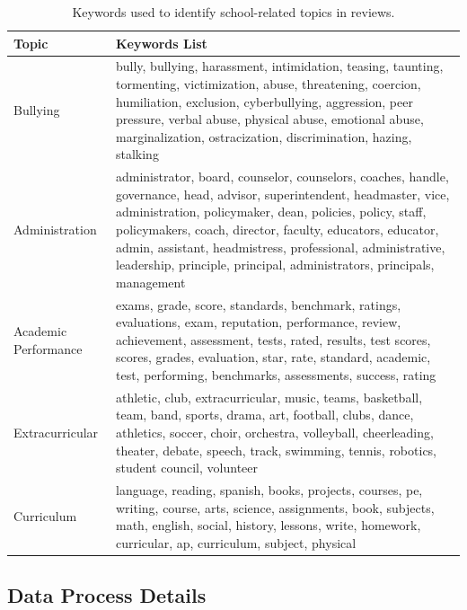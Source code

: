 \documentclass[11pt]{article}
\begin{document}
\begin{table}[!ht]
\centering
\caption{Keywords used to identify school-related topics in reviews.}
\label{tab:keywords}
\begin{tabularx}{\textwidth}{|p{2.1cm}|X|}
\hline
\textbf{Topic} & \textbf{Keywords List} \\
\hline
Bullying & bully, bullying, harassment, intimidation, teasing, taunting, tormenting, victimization, abuse, threatening, coercion, humiliation, exclusion, cyberbullying, aggression, peer pressure, verbal abuse, physical abuse, emotional abuse, marginalization, ostracization, discrimination, hazing, stalking \\
\hline
Administration & administrator, board, counselor, counselors, coaches, handle, governance, head, advisor, superintendent, headmaster, vice, administration, policymaker, dean, policies, policy, staff, policymakers, coach, director, faculty, educators, educator, admin, assistant, headmistress, professional, administrative, leadership, principle, principal, administrators, principals, management \\
\hline
Academic Performance & exams, grade, score, standards, benchmark, ratings, evaluations, exam, reputation, performance, review, achievement, assessment, tests, rated, results, test scores, scores, grades, evaluation, star, rate, standard, academic, test, performing, benchmarks, assessments, success, rating \\
\hline
Extracurricular & athletic, club, extracurricular, music, teams, basketball, team, band, sports, drama, art, football, clubs, dance, athletics, soccer, choir, orchestra, volleyball, cheerleading, theater, debate, speech, track, swimming, tennis, robotics, student council, volunteer \\
\hline
Curriculum & language, reading, spanish, books, projects, courses, pe, writing, course, arts, science, assignments, book, subjects, math, english, social, history, lessons, write, homework, curricular, ap, curriculum, subject, physical \\
\hline
\end{tabularx}
\end{table}


\subsection{Data Process Details}
\label{sec:data_collection_detail}
\end{document}
